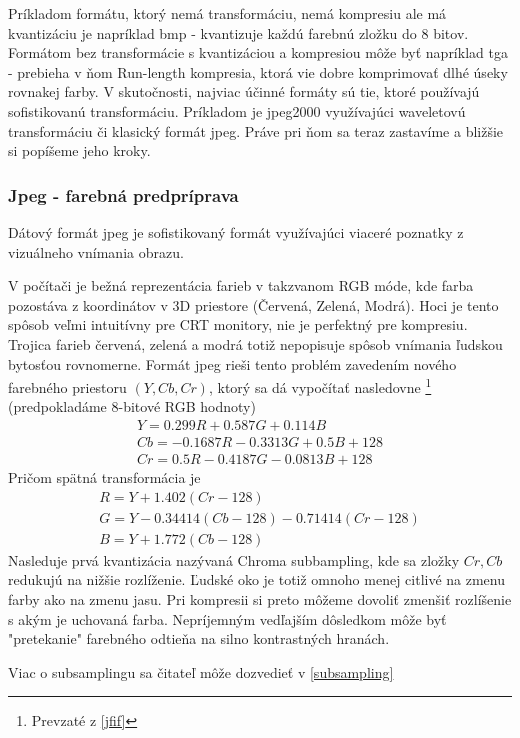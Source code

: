Príkladom formátu, ktorý nemá transformáciu, nemá kompresiu ale má
kvantizáciu je napríklad bmp - kvantizuje každú farebnú zložku do 8
bitov. Formátom bez transformácie s kvantizáciou a kompresiou môže byť
napríklad tga - prebieha v ňom Run-length kompresia, ktorá vie dobre
komprimovať dlhé úseky rovnakej farby.
V skutočnosti, najviac účinné formáty sú tie, ktoré používajú
sofistikovanú transformáciu. Príkladom je jpeg2000 využívajúci
waveletovú transformáciu či klasický formát jpeg. Práve pri ňom sa
teraz zastavíme a bližšie si popíšeme jeho kroky.

\subsubsection{Jpeg - farebná predpríprava}
Dátový formát jpeg je sofistikovaný formát využívajúci viaceré
poznatky z vizuálneho vnímania obrazu.

V počítači je bežná reprezentácia farieb v takzvanom RGB móde, kde
farba pozostáva z koordinátov v 3D priestore (Červená, Zelená, Modrá).
Hoci je tento spôsob veľmi intuitívny pre CRT monitory, nie je
perfektný pre kompresiu. Trojica farieb červená, zelená a modrá totiž
nepopisuje spôsob vnímania ľudskou bytosťou rovnomerne. Formát jpeg
rieši tento problém zavedením nového farebného priestoru $(Y,Cb,Cr)$,
ktorý sa dá vypočítať nasledovne \footnote{Prevzaté z \ref{jfif}} (predpokladáme 8-bitové RGB hodnoty)
\begin{align}
    Y = 0.299 R + 0.587 G + 0.114 B \\
    Cb = -0.1687R - 0.3313G + 0.5B + 128 \\
    Cr = 0.5R - 0.4187 G - 0.0813B + 128
\end{align}
Pričom spätná transformácia je
\begin{align}
    R = Y + 1.402 (Cr - 128) \\
    G = Y - 0.34414 (Cb-128) - 0.71414 (Cr-128) \\
    B = Y + 1.772 (Cb - 128)
\end{align}
Nasleduje prvá kvantizácia nazývaná Chroma subbampling, 
kde sa zložky  $Cr, Cb$ redukujú na nižšie
rozlíženie. Ľudské oko je totiž omnoho menej citlivé na zmenu farby
ako na zmenu jasu. Pri kompresii si preto môžeme dovoliť zmenšiť
rozlíšenie s akým je uchovaná farba.
Nepríjemným vedľajším dôsledkom môže byť "pretekanie" farebného
odtieňa na silno kontrastných hranách.
\begin{poznamka}
Viac o subsamplingu sa čitateľ môže dozvedieť v 
\ref{subsampling}
\end{poznamka}

